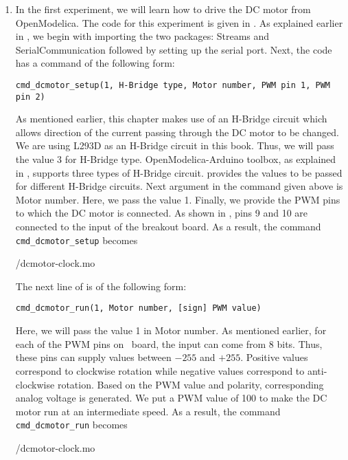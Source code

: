 \begin{enumerate}
  \item In the first experiment, we will learn how to drive the DC motor
        from OpenModelica. The code for this experiment is 
        given in  . 
        As explained earlier in , 
        we begin with importing the two packages: Streams and SerialCommunication followed 
        by setting up the serial port. Next, the code has a command of the following form: 
        \begin{lstlisting}[style=nonumbers]
          cmd_dcmotor_setup(1, H-Bridge type, Motor number, PWM pin 1, PWM pin 2)
        \end{lstlisting}
        As mentioned earlier, this chapter makes use of an H-Bridge circuit which 
        allows direction of the current passing through the DC motor to be changed.
        We are using L293D as an H-Bridge circuit in this book. Thus, we will pass the value 3 for
        H-Bridge type. OpenModelica-Arduino toolbox, as explained in 
        , 
        supports three types of H-Bridge circuit. 
        provides the values to be passed for different H-Bridge circuits. 
        Next argument in the command given above is Motor number. Here, we pass the value 1. 
        Finally, we provide the PWM pins to which the DC motor is connected. As 
        shown in , pins 9 and 10 are connected to the
        input of the breakout board. As a result, the command {\tt cmd\_dcmotor\_setup} becomes
        
        {\LocDCMOpenModelicacode/dcmotor-clock.mo}
        
        The next line of  is of the following form: 
        \begin{lstlisting}[style=nonumbers]
          cmd_dcmotor_run(1, Motor number, [sign] PWM value)
        \end{lstlisting}
        Here, we will pass the value 1 in Motor number.  As mentioned earlier, 
        for each of the PWM pins on \arduino\ board, the input can come from 8 bits.
        Thus, these pins can supply values between $- 255$ and $+ 255$. Positive values correspond to clockwise
        rotation while negative values correspond to anti-clockwise rotation. Based on the PWM value and polarity, 
        corresponding analog voltage is generated.  
        We put a PWM value of 100 to make the DC motor run at an intermediate speed.  
        As a result, the command {\tt cmd\_dcmotor\_run} becomes
        
        {\LocDCMOpenModelicacode/dcmotor-clock.mo}
        

\end{enumerate}
